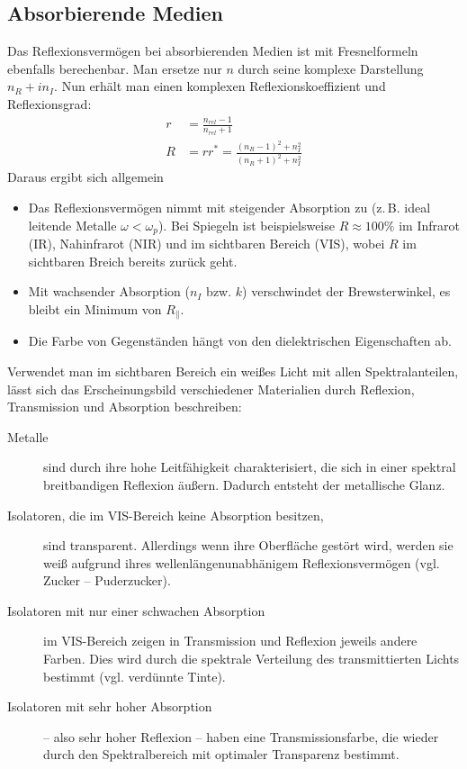 
\subsection{Absorbierende Medien}
Das Reflexionsvermögen bei absorbierenden Medien ist mit
Fresnelformeln ebenfalls berechenbar. 
Man ersetze nur $n$ durch seine komplexe Darstellung $n_R+in_I$. Nun
erhält man einen komplexen Reflexionskoeffizient und
Reflexionsgrad:
\begin{align*}
  r &= \frac{n_{rel}-1}{n_{rel}+1}\\
  R &= rr^*=\frac{(n_R-1)^2+n_I^2}{(n_R+1)^2+n_I^2}
\end{align*}
Daraus ergibt sich allgemein
\begin{itemize}
\item Das Reflexionsvermögen nimmt mit steigender Absorption
  zu (z.\,B. ideal leitende Metalle $\omega<\omega_p$). Bei Spiegeln
  ist beispielsweise $R\approx100\%$ im Infrarot (IR), Nahinfrarot
  (NIR) und im sichtbaren Bereich (VIS), wobei $R$ im sichtbaren
  Breich bereits zurück geht.
\item Mit wachsender Absorption ($n_I$ bzw. $k$) verschwindet der Brewsterwinkel, es bleibt ein Minimum von $R_{\parallel}$.
\item Die Farbe von Gegenständen hängt von den dielektrischen Eigenschaften ab.
\end{itemize}

Verwendet man im sichtbaren Bereich ein weißes Licht mit allen
Spektralanteilen, lässt sich das Erscheinungsbild verschiedener
Materialien durch Reflexion, Transmission und Absorption beschreiben:
\begin{description}
\item[Metalle] sind durch ihre hohe Leitfähigkeit
  charakterisiert, die sich in einer spektral breitbandigen Reflexion
  äußern. Dadurch entsteht der metallische Glanz.
\item[Isolatoren, die im VIS-Bereich keine Absorption besitzen,]
  sind transparent. Allerdings wenn ihre Oberfläche gestört wird,
  werden sie weiß aufgrund ihres wellenlängenunabhänigem
  Reflexionsvermögen (vgl. Zucker -- Puderzucker). 
\item[Isolatoren mit nur einer schwachen Absorption] im VIS-Bereich
  zeigen in Transmission und Reflexion jeweils andere Farben. Dies
  wird durch die spektrale Verteilung des transmittierten Lichts
  bestimmt (vgl. verdünnte Tinte). 
\item[Isolatoren mit sehr hoher Absorption] -- also sehr hoher
  Reflexion -- haben eine Transmissionsfarbe, die wieder durch den
  Spektralbereich mit optimaler Transparenz bestimmt.
\end{description}

